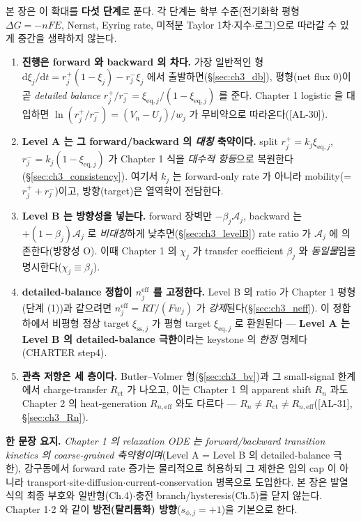 \documentclass[11pt,a4paper]{article}
\newcommand{\dd}{\mathrm{d}}
\newcommand{\eff}{\mathrm{eff}}
\newcommand{\eq}{\mathrm{eq}}
\newcommand{\ct}{\mathrm{ct}}
\newcommand{\sstat}{\mathrm{ss}}
\newcommand{\AL}[1]{\textsf{[AL-#1]}}
\begin{document}
본 장은 이 확대를 \textbf{다섯 단계}로 푼다. 각 단계는 학부 수준(전기화학 평형 $\Delta G=-nF E$, Nernst,
Eyring rate, 미적분 Taylor 1차$\cdot$지수$\cdot$로그)으로 따라갈 수 있게 중간을 생략하지 않는다.
\begin{enumerate}[label=\textbf{(\arabic*)},leftmargin=2.2em]
\item \textbf{진행은 forward 와 backward 의 차다.} 가장 일반적인 형 $\dd\xi_j/\dd t=r_j^+(1-\xi_j)-r_j^-\xi_j$
  에서 출발하면(\S\ref{sec:ch3_db}), 평형(net flux $0$)이 곧 \emph{detailed balance} $r_j^+/r_j^-=\xi_{\eq,j}/(1-\xi_{\eq,j})$
  를 준다. Chapter 1 logistic 을 대입하면 $\ln(r_j^+/r_j^-)=(V_n-U_j)/w_j$ 가 무비약으로 따라온다(\AL{30}).
\item \textbf{Level A 는 그 forward/backward 의 \emph{대칭} 축약이다.} split $r_j^+=k_j\xi_{\eq,j}$,
  $r_j^-=k_j(1-\xi_{\eq,j})$ 가 Chapter 1 식을 \emph{대수적 항등}으로 복원한다(\S\ref{sec:ch3_consistency}).
  여기서 $k_j$ 는 forward-only rate 가 아니라 mobility(=$r_j^++r_j^-$)이고, 방향(target)은 열역학이 전담한다.
\item \textbf{Level B 는 방향성을 넣는다.} forward 장벽만 $-\beta_j\mathcal A_j$, backward 는 $+(1-\beta_j)\mathcal A_j$
  로 \emph{비대칭}하게 낮추면(\S\ref{sec:ch3_levelB}) rate ratio 가 $\mathcal A_j$ 에 의존한다(방향성 O). 이때
  Chapter 1 의 $\chi_j$ 가 transfer coefficient $\beta_j$ 와 \emph{동일물}임을 명시한다($\chi_j\equiv\beta_j$).
\item \textbf{detailed-balance 정합이 $n_j^{\eff}$ 를 고정한다.} Level B 의 ratio 가 Chapter 1 평형(단계 (1))과
  같으려면 $n_j^{\eff}=RT/(Fw_j)$ 가 \emph{강제}된다(\S\ref{sec:ch3_neff}). 이 정합 하에서 비평형 정상 target
  $\xi_{\sstat,j}$ 가 평형 target $\xi_{\eq,j}$ 로 환원된다 — \textbf{Level A 는 Level B 의 detailed-balance
  극한}이라는 keystone 의 \emph{한정} 명제다(CHARTER step4).
\item \textbf{관측 저항은 세 층이다.} Butler--Volmer 형(\S\ref{sec:ch3_bv})과 그 small-signal 한계에서
  charge-transfer $R_\ct$ 가 나오고, 이는 Chapter 1 의 apparent shift $R_n$ 과도 Chapter 2 의 heat-generation
  $R_{n,\eff}$ 와도 다르다 — $R_n\ne R_\ct\ne R_{n,\eff}$(\AL{31}, \S\ref{sec:ch3_Rn}).
\end{enumerate}

\noindent\textbf{한 문장 요지.} \emph{Chapter 1 의 relaxation ODE 는 forward/backward transition kinetics 의
coarse-grained 축약형이며}(Level A = Level B 의 detailed-balance 극한), 강구동에서 forward rate 증가는
물리적으로 허용하되 그 제한은 임의 cap 이 아니라 transport$\cdot$site$\cdot$diffusion$\cdot$current-conservation
병목으로 도입한다. 본 장은 발열식의 최종 부호와 일반형(Ch.4)$\cdot$충전 branch/hysteresis(Ch.5)를 닫지 않는다.
Chapter 1$\cdot$2 와 같이 \textbf{방전(탈리튬화) 방향}($s_{\phi,j}=+1$)을 기본으로 한다.
\end{document}
